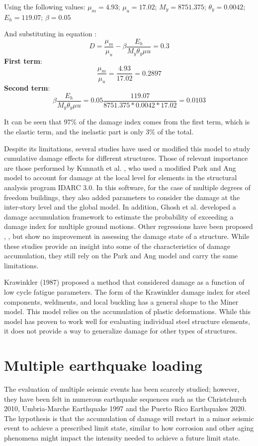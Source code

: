 Using the following values: $\mu_{m}=4.93$; $\mu_{u}=17.02$; $M_{y}=8751.375$; $\theta_y=0.0042$; $E_{h}=119.07$; $\beta=0.05$ 

And substituting in equation :
\[
 D=\frac{\mu_{m}}{\mu_{u}}-\beta\frac{E_h}{M_{y}\theta_y\mu{u}}=0.3
	\]
\textbf{First term}:
\[
\frac{\mu_{m}}{\mu_{u}}=\frac{4.93}{17.02}=0.2897
\]
\textbf{Second term}: 
\[	
	\beta \frac{E_h}{M_{y}\theta_y\mu{u}}=0.05\frac{119.07}{8751.375*0.0042*17.02}=0.0103
\]

It can be seen that 97\% of the damage index comes from the first term, which is the elastic term, and the inelastic part is only 3\% of the total. 

Despite its limitations, several studies have used or modified this model to study cumulative damage effects for different structures. Those of relevant importance are those performed by Kunnath et al. \cite{Kunnath1992}, who used a modified Park and Ang model to account for damage at the local level for elements in the structural analysis program IDARC 3.0. In this software, for the case of multiple degrees of freedom buildings, they also added parameters to consider the damage at the inter-story level and the global model. In addition, Ghosh et al. \cite{Ghosh2015} developed a damage accumulation framework to estimate the probability of exceeding a damage index for multiple ground motions. Other regressions have been proposed \cite{Khashaee}, \cite{Fajfar1992}, \cite{Roufaiel} but show no improvement in assessing the damage state of a structure. While these studies provide an insight into some of the characteristics of damage accumulation, they still rely on the Park and Ang model and carry the same limitations.

Krawinkler (1987) \cite{Krawinkler1987} proposed a method that considered damage as a function of low cycle fatigue parameters. The form of the Krawinkler damage index for steel components, weldments, and local buckling has a general shape to the Miner model. This model relies on the accumulation of plastic deformations. While this model has proven to work well for evaluating individual steel structure elements, it does not provide a way to generalize damage for other types of structures.


\section{Multiple earthquake loading}

The evaluation of multiple seismic events has been scarcely studied; however, they have been felt in numerous earthquake sequences such as the Christchurch 2010, Umbria-Marche Earthquake 1997 and the Puerto Rico Earthquakes 2020. The hypothesis is that the accumulation of damage will restart in a minor seismic event to achieve a prescribed limit state, similar to how corrosion and other aging phenomena might impact the intensity needed to achieve a future limit state. 

